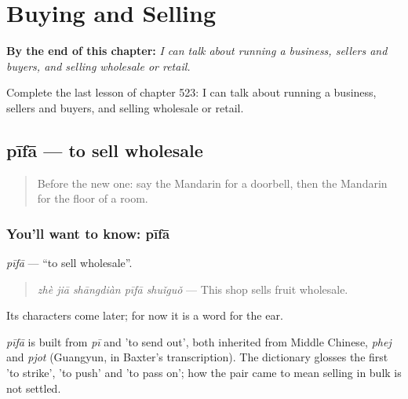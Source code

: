 
\chapter{Buying and Selling}
\label{ch:zh-buying-and-selling}

\begin{chapteropening}
\textbf{By the end of this chapter:} \emph{I can talk about running a business, sellers and buyers, and selling wholesale or retail.}

Complete the last lesson of chapter 523: I can talk about running a business, sellers and buyers, and selling wholesale or retail.
\end{chapteropening}

\section[pīfā]{pīfā — to sell wholesale}

\label{lesson:ZH-C523-pifa}



\begin{quote}
Before the new one: say the Mandarin for a doorbell, then the Mandarin for the floor of a room.
\end{quote}

\subsection*{You'll want to know: pīfā}
\emph{pīfā} — \textquotedblleft{}to sell wholesale\textquotedblright{}.

\begin{quote}
\emph{zhè jiā shāngdiàn pīfā shuǐguǒ} — This shop sells fruit wholesale.
\end{quote}

Its characters come later; for now it is a word for the ear.

\begin{cousinweb}
\emph{pīfā} is built from \emph{pī} and  'to send out', both inherited from Middle Chinese, \emph{phej} and \emph{pjot} (Guangyun, in Baxter's transcription). The dictionary glosses the first 'to strike', 'to push' and 'to pass on'; how the pair came to mean selling in bulk is not settled.
\end{cousinweb}

